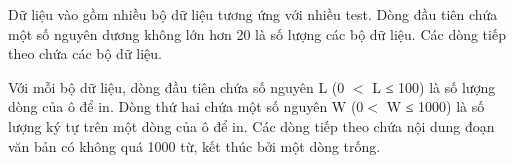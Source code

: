 Dữ liệu vào gồm nhiều bộ dữ liệu tương ứng với nhiều test. Dòng đầu tiên chứa một số nguyên dương không lớn hơn 20 là số lượng các bộ dữ liệu. Các dòng tiếp theo chứa các bộ dữ liệu.  

   Với mỗi bộ dữ liệu, dòng đầu tiên chứa số nguyên L (0 $<$ L ≤ 100) là số lượng dòng của ô để in. Dòng thứ hai chứa một số nguyên W (0$<$ W ≤ 1000) là số lượng ký tự trên một dòng của ô để in. Các dòng tiếp theo chứa nội dung đoạn văn bản có không quá 1000 từ, kết thúc bởi một dòng trống.  

\